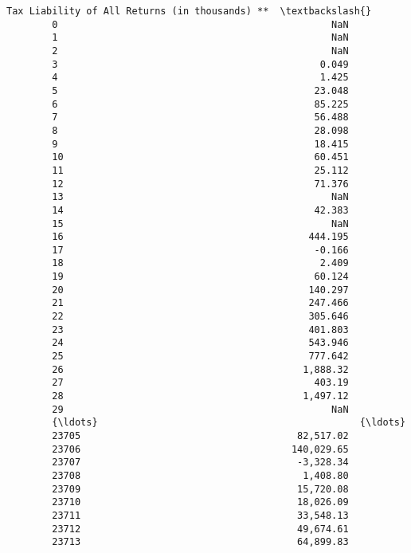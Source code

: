 \documentclass[11pt]{article}
\begin{document}
\begin{Verbatim}[commandchars=\\\{\}]
              Tax Liability of All Returns (in thousands) **  \textbackslash{}
        0                                                NaN   
        1                                                NaN   
        2                                                NaN   
        3                                              0.049   
        4                                              1.425   
        5                                             23.048   
        6                                             85.225   
        7                                             56.488   
        8                                             28.098   
        9                                             18.415   
        10                                            60.451   
        11                                            25.112   
        12                                            71.376   
        13                                               NaN   
        14                                            42.383   
        15                                               NaN   
        16                                           444.195   
        17                                            -0.166   
        18                                             2.409   
        19                                            60.124   
        20                                           140.297   
        21                                           247.466   
        22                                           305.646   
        23                                           401.803   
        24                                           543.946   
        25                                           777.642   
        26                                          1,888.32   
        27                                            403.19   
        28                                          1,497.12   
        29                                               NaN   
        {\ldots}                                              {\ldots}   
        23705                                      82,517.02   
        23706                                     140,029.65   
        23707                                      -3,328.34   
        23708                                       1,408.80   
        23709                                      15,720.08   
        23710                                      18,026.09   
        23711                                      33,548.13   
        23712                                      49,674.61   
        23713                                      64,899.83   

\end{Verbatim}
\end{document}
